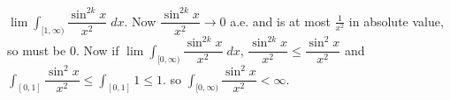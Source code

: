 \begin{ex}
$\lim \int_{[1,\infty)} \dfrac{\sin^{2k} x}{x^2} \; dx$. Now $\dfrac{\sin^{2k} x}{x^2} \to 0$ a.e. and is at most $\frac{1}{x^2}$ in absolute value, so must be 0. Now if $\lim \int_{[0,\infty)} \dfrac{\sin^{2k} x}{x^2} \; dx$, $\dfrac{\sin^{2k} x}{x^2} \leq \dfrac{\sin^2 x}{x^2}$ and $\int_{[0,1]} \dfrac{\sin^2 x}{x^2} \leq \int_{[0,1]} 1 \leq 1$. so $\int_{[0,\infty)} \dfrac{\sin^2 x}{x^2}< \infty$.
\end{ex}



































